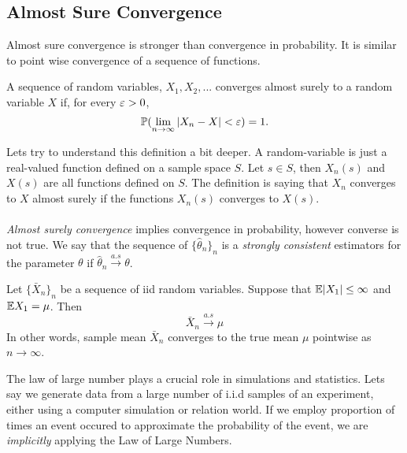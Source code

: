 \subsection{Almost Sure Convergence}
Almost sure convergence is stronger than convergence in probability. It is similar to point wise convergence of a sequence of functions.
\begin{definition}
    A sequence of random variables, $X_1,X_2,...$ converges almost surely to a random variable $X$ if, for every $\varepsilon > 0$,
    $$
    \mathbb P(\lim_{n \to \infty}|X_n - X|< \varepsilon ) = 1.
    $$
\end{definition}
Lets try to understand this definition a bit deeper. A random-variable is just a real-valued function defined on a sample space $S$. Let $s \in S$, then $X_{n}(s)$ and $X(s)$ are all functions defined on $S$. The definition is saying that $X_n$ converges to $X$ almost surely if the functions $X_{n}(s)$ converges to $X(s)$.\\
\\
 \textit{Almost surely convergence} implies convergence in probability, however converse is not true. We say that the sequence of $\{ \hat{\theta}_n \}_n$ is a \textit{strongly consistent} estimators for the parameter $\theta$ if $\hat{\theta}_n \xrightarrow{a.s} \theta$.
\begin{theorem}
    Let $\{ \bar{X}_n \}_n$ be a sequence of iid random variables. Suppose that $\mathbb E|X_1| \leq \infty$ and $\mathbb E X_1 = \mu$. Then 
    $$
    \bar{X}_n \xrightarrow{a.s} \mu 
    $$
    In other words, sample mean $\bar{X}_n$ converges to the true mean $\mu$ pointwise as $n \to \infty$.
\end{theorem}
The law of large number plays a crucial role in simulations and statistics. Lets say we generate data from a large number of i.i.d samples of an experiment, either using a computer simulation or relation world. If we employ proportion of times an event occured to approximate the probability of the event, we are \textit{implicitly} applying the Law of Large Numbers. 

